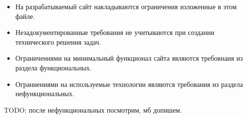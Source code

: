 \begin{itemize}
    \item На разрабатываемый сайт накладываются ограничения изложенные в этом файле.
    \item Незадокументированные требования не учитываются при создании технического решения задач.
    \item Ограничениями на минимальный функционал сайта являются требовнаия из раздела функциональных.
    \item Ограниениями на используемые технологии являются требования из раздела нефункциональных.
\end{itemize}

TODO: после нефункциональных посмотрим, мб допишем.